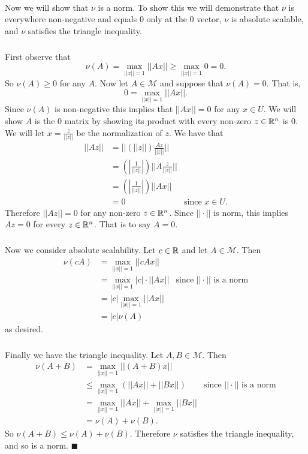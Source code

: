 \documentclass[letterpaper,12pt,oneside,onecolumn]{article}
\newcommand{\cM}{\mathcal{M}} \newcommand{\cN}{\mathcal{N}}
\begin{document}
\paragraph{}
Now we will show that $\nu$ is a norm. To show this we will demonstrate that $\nu$ is everywhere non-negative and equals $0$ only at the $0$ vector, $\nu$ is absolute scalable, and $\nu$ satisfies the triangle inequality.
\subparagraph{}
First observe that
$$\nu(A) = \max_{||x||=1} ||Ax|| \geq \max_{||x||=1} 0 = 0.$$
So $\nu(A) \geq 0$ for any $A$. Now let $A \in \cM$ and suppose that $\nu(A) = 0$. That is,
$$0 = \max_{||x|| = 1} ||Ax||.$$
Since $\nu(A)$ is non-negative this implies that $||Ax|| = 0$ for any $x \in U$.
We will show $A$ is the $0$ matrix by showing its product with every non-zero $z \in \mathbb{R}^n$ is $0$. We will let $x = \frac{z}{||z||}$ be the normalization of $z$. We have that
\begin{align*}
||Az|| &= ||(||z||)\frac{Az}{||z||}|| \\
&=(|\frac{1}{||z||}|) ||A\frac{z}{||z||}|| \\
&= (|\frac{1}{||z||}|)||Ax|| \\
&= 0 &\text{since $x \in U$}.
\end{align*}
Therefore $||Az|| = 0$ for any non-zero $z \in \mathbb{R}^n$. Since $||\cdot||$ is norm, this implies $Az = 0$ for every $z \in \mathbb{R}^n$. That is to say $A=0$.
\subparagraph{}
Now we consider absolute scalability. Let $c \in \mathbb{R}$ and let $A \in \cM$. Then
\begin{align*}
\nu(cA) &= \max_{||x||=1} ||cAx|| \\
&= \max_{||x||=1} |c|\cdot||Ax|| &\text{since $||\cdot||$ is a norm}\\
&= |c| \max_{||x||=1} ||Ax|| \\
&= |c| \nu(A)
\end{align*}
as desired.
\subparagraph{}
Finally we have the triangle inequality. Let $A,B \in \cM$. Then
\begin{align*}
\nu(A + B) &= \max_{||x||=1} ||(A+B)x|| \\
&\leq \max_{||x||=1} (||Ax|| + ||Bx||) &\text{since $||\cdot||$ is a norm}\\
&= \max_{||x||=1} ||Ax|| + \max_{||x||=1} ||Bx|| \\
&= \nu(A) + \nu(B).
\end{align*}
So $\nu(A+B) \leq \nu(A) + \nu(B)$. Therefore $\nu$ satisfies the triangle inequality, and so is a norm. $\blacksquare$

\section{}
\end{document}

